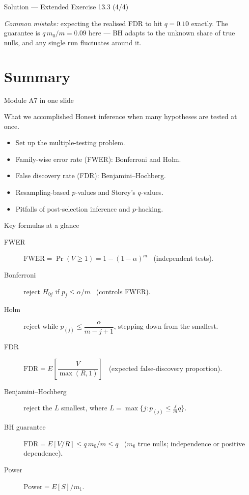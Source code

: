 \documentclass[aspectratio=169,11pt]{beamer}
\begin{document}
\begin{frame}{Solution --- Extended Exercise 13.3 (4/4)}
\begin{solutionbox}
  \smallskip
  \textit{Common mistake:} expecting the realised FDR to hit $q=0.10$ exactly. The
  guarantee is $q\,m_0/m=0.09$ here --- BH adapts to the unknown share of true nulls,
  and any single run fluctuates around it.
\end{solutionbox}
\end{frame}

\section{Summary}

\begin{frame}{Module A7 in one slide}
  \begin{block}{What we accomplished}
    Honest inference when many hypotheses are tested at once.
  \end{block}
  \begin{itemize}
    \item Set up the multiple-testing problem.
    \item Family-wise error rate (FWER): Bonferroni and Holm.
    \item False discovery rate (FDR): Benjamini--Hochberg.
    \item Resampling-based $p$-values and Storey's $q$-values.
    \item Pitfalls of post-selection inference and $p$-hacking.
  \end{itemize}
\end{frame}

\begin{frame}{Key formulas at a glance}
  \footnotesize
  \begin{description}
    \item[FWER] $\mathrm{FWER}=\Pr(V\ge 1)=1-(1-\alpha)^m$ \ (independent tests).
    \item[Bonferroni] reject $H_{0j}$ if $p_j\le \alpha/m$ \ (controls FWER).
    \item[Holm] reject while $p_{(j)}\le \dfrac{\alpha}{m-j+1}$, stepping down from the smallest.
    \item[FDR] $\mathrm{FDR}=E\!\left[\dfrac{V}{\max(R,1)}\right]$ \ (expected false-discovery proportion).
    \item[Benjamini--Hochberg] reject the $L$ smallest, where $L=\max\{j: p_{(j)}\le \tfrac{j}{m}q\}$.
    \item[BH guarantee] $\mathrm{FDR}=E[V/R]\le q\,m_0/m\le q$ \ ($m_0$ true nulls; independence or positive dependence).
    \item[Power] $\mathrm{Power}=E[S]/m_1$.
  \end{description}
\end{frame}
\end{document}

